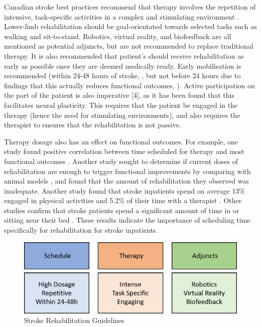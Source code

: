 \documentclass[12pt]{report}
\begin{document}
Canadian stroke best practices recommend that therapy involves the repetition of intensive, task-specific activities in a complex and stimulating environment \cite{Hebert2016}. Lower-limb rehabilitation should be goal-orientated towards selected tasks such as walking and sit-to-stand. Robotics, virtual reality, and biofeedback are all mentioned as potential adjuncts, but are not recommended to replace traditional therapy. It is also recommended that patient's should receive rehabilitation as early as possible once they are deemed medically ready. Early mobilisation is recommended (within 24-48 hours of stroke, \cite{Casaubon2016}, but not before 24 hours due to findings that this actually reduces functional outcomes, \cite{AVERTTrialCollaborationgroup2015}). Active participation on the part of the patient is also imperative [4], as it has been found that this facilitates neural plasticity. This requires that the patient be engaged in the therapy (hence the need for stimulating environments), and also requires the therapist to ensures that the rehabilitation is not passive.

Therapy dosage also has an effect on functional outcomes. For example, one study found positive correlation between time scheduled for therapy and most functional outcomes \cite{Lohse2014}. Another study sought to determine if current doses of rehabilitation are enough to trigger functional improvements by comparing with animal models \cite{Lang2009}, and found that the amount of rehabilitation they observed was inadequate. Another study found that stroke inpatients spend on average 13\% engaged in physical activities and 5.2\% of their time with a therapist \cite{Bernhardt2004}. Other studies confirm that stroke patients spend a significant amount of time in or sitting near their bed \cite{King2011}. These results indicate the importance of scheduling time specifically for rehabilitation for stroke inpatients. 

	\begin{figure}[h] 
		\centering
		\includegraphics[width=0.75\linewidth]{guidelines}
		\caption{Stroke Rehabilitation Guidelines}
		\label{fig:guidelines}
	\end{figure}
\end{document}
